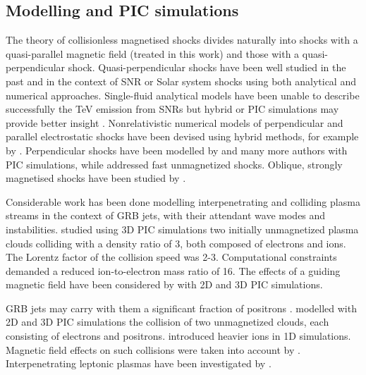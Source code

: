 \documentclass[structabstract]{aa}
\begin{document}
\subsection{Modelling and PIC simulations}

The theory of collisionless magnetised shocks divides naturally into shocks 
with a quasi-parallel magnetic field (treated in this work) and those with 
a quasi-perpendicular shock. Quasi-perpendicular shocks have been well 
studied in the past and in the context of SNR or Solar system shocks 
using both analytical and numerical approaches. Single-fluid analytical 
models have been unable to describe successfully the TeV emission from SNRs 
but hybrid or PIC simulations may provide better insight \citep{Kirk:2001fk}. 
Nonrelativistic numerical models of perpendicular and parallel 
electrostatic shocks have been devised using hybrid methods, for example by 
\citep{Leroy:1981zr,Quest:1988fr}. 
Perpendicular shocks have been modelled by 
\citet{Lee:2004lr,Scholer:2004qy,Amano:2007fj,Umeda:2009rt,Lembege:2009mz} and
many more authors with PIC simulations, while \citet{Sorasio:2006fv} 
addressed fast unmagnetized shocks.
{ Oblique, strongly magnetised shocks have been studied by 
\citet{Lembege:1989lr,Bessho:1999sf,Dieckmann:2008dp,Sironi:2009kt,Shikii:2010lr,Murphy:2010fk}.
}

Considerable work has been done modelling interpenetrating and colliding 
plasma streams in the context of GRB jets, with their attendant wave modes 
and instabilities. \citet{Frederiksen:2004rm} studied using 3D PIC simulations
two initially unmagnetized plasma clouds colliding with a density ratio of 3,
 both composed of electrons and ions. The Lorentz factor of the 
collision speed was 2-3. Computational constraints demanded a reduced 
ion-to-electron mass ratio of 16. The effects of a guiding magnetic field
have been considered by \citet{Nishikawa:2003eu,Hededal:2005zl,Dieckmann:2006tx} 
with 2D and 3D PIC simulations. 

GRB jets may carry with them a significant fraction of positrons 
\citep{Piran:1999jt}. \citet{Kazimura:1998fp,Jaroschek:2004lq,Spitkovsky:2008rm} 
modelled with 2D and 3D PIC simulations the collision of two unmagnetized clouds, 
each consisting of electrons and positrons. \citet{Hoshino:1992fk} introduced heavier 
ions in 1D simulations. Magnetic field effects on such collisions were taken into 
account by \citet{Spitkovsky:2005hi,Sironi:2009kt}. Interpenetrating leptonic 
plasmas have been investigated by \citet{Silva:2003rw}.
\end{document}
